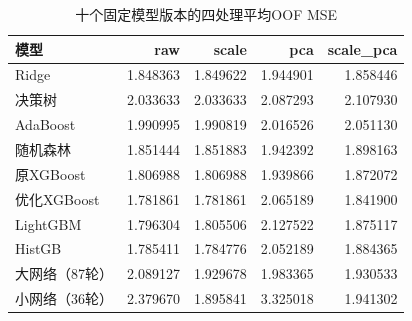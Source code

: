 \begin{table}[htbp]
\small
\setlength{\tabcolsep}{5pt}
\centering
\caption{十个固定模型版本的四处理平均OOF MSE}
\label{tab:factorial}
\begin{tabular}{lrrrr}
\toprule
模型 & raw & scale & pca & scale\_pca \\
\midrule
Ridge & 1.848363 & 1.849622 & 1.944901 & 1.858446 \\
决策树 & 2.033633 & 2.033633 & 2.087293 & 2.107930 \\
AdaBoost & 1.990995 & 1.990819 & 2.016526 & 2.051130 \\
随机森林 & 1.851444 & 1.851883 & 1.942392 & 1.898163 \\
原XGBoost & 1.806988 & 1.806988 & 1.939866 & 1.872072 \\
优化XGBoost & 1.781861 & 1.781861 & 2.065189 & 1.841900 \\
LightGBM & 1.796304 & 1.805506 & 2.127522 & 1.875117 \\
HistGB & 1.785411 & 1.784776 & 2.052189 & 1.884365 \\
大网络（87轮） & 2.089127 & 1.929678 & 1.983365 & 1.930533 \\
小网络（36轮） & 2.379670 & 1.895841 & 3.325018 & 1.941302 \\
\bottomrule
\end{tabular}
\end{table}
